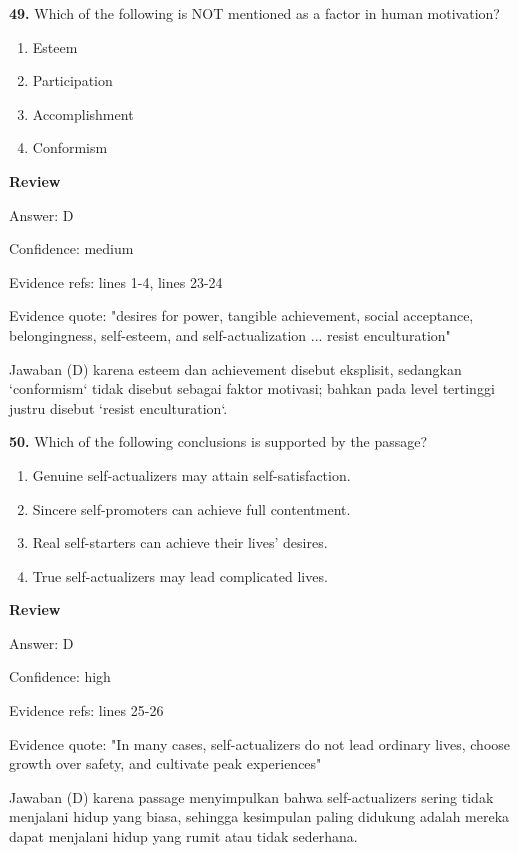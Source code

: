 \documentclass[12pt]{article}
\begin{document}
\endgroup
\par
\vspace{0.25\baselineskip}
\noindent\textbf{49.} Which of the following is NOT mentioned as a factor in human motivation?
\begin{enumerate}[label=(\Alph*),leftmargin=*,itemsep=0.2em]
\item Esteem
\item Participation
\item Accomplishment
\item Conformism
\end{enumerate}
\par
\begingroup
\setlength{\parskip}{0pt}
\setlength{\parindent}{0pt}
\textbf{Review}\par
Answer: D\par
Confidence: medium\par
Evidence refs: lines 1-4, lines 23-24\par
Evidence quote: "desires for power, tangible achievement, social acceptance, belongingness, self-esteem, and self-actualization ... resist enculturation"\par
Jawaban (D) karena esteem dan achievement disebut eksplisit, sedangkan `conformism` tidak disebut sebagai faktor motivasi; bahkan pada level tertinggi justru disebut `resist enculturation`.\par
\endgroup
\par
\vspace{0.25\baselineskip}
\noindent\textbf{50.} Which of the following conclusions is supported by the passage?
\begin{enumerate}[label=(\Alph*),leftmargin=*,itemsep=0.2em]
\item Genuine self-actualizers may attain self-satisfaction.
\item Sincere self-promoters can achieve full contentment.
\item Real self-starters can achieve their lives' desires.
\item True self-actualizers may lead complicated lives.
\end{enumerate}
\par
\begingroup
\setlength{\parskip}{0pt}
\setlength{\parindent}{0pt}
\textbf{Review}\par
Answer: D\par
Confidence: high\par
Evidence refs: lines 25-26\par
Evidence quote: "In many cases, self-actualizers do not lead ordinary lives, choose growth over safety, and cultivate peak experiences"\par
Jawaban (D) karena passage menyimpulkan bahwa self-actualizers sering tidak menjalani hidup yang biasa, sehingga kesimpulan paling didukung adalah mereka dapat menjalani hidup yang rumit atau tidak sederhana.\par
\endgroup
\par
\vspace{0.25\baselineskip}
\newpage
\end{document}

